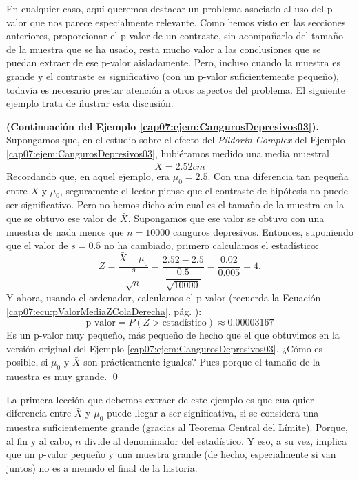 En cualquier caso, aquí queremos destacar un problema asociado al uso del p-valor que nos parece especialmente relevante. Como hemos visto en las secciones anteriores, proporcionar el p-valor de un contraste, sin acompañarlo del tamaño de la muestra que se ha usado, resta mucho valor a las conclusiones que se puedan extraer de ese p-valor aisladamente.
Pero, incluso cuando la muestra es grande y el contraste es significativo (con un p-valor suficientemente pequeño), todavía es necesario prestar atención a otros aspectos del problema. El siguiente ejemplo trata de ilustrar esta discusión.
\begin{ejemplo}{\bf (Continuación del Ejemplo \ref{cap07:ejem:CangurosDepresivos03}).}
\label{cap07:ejem:AbusoPValor}
Supongamos que, en el estudio sobre el efecto del {\em Pildorín Complex} del Ejemplo \ref{cap07:ejem:CangurosDepresivos03}, hubiéramos medido una media muestral
\[\bar X=2.52 cm\]
Recordando que, en aquel ejemplo, era $\mu_0=2.5$. Con una diferencia tan pequeña entre $\bar X$ y $\mu_0$, seguramente el lector piense que el contraste de hipótesis no puede ser significativo. Pero no hemos dicho aún cual es el tamaño de la muestra en la que se obtuvo ese valor de $\bar X$. Supongamos que ese valor se obtuvo con una muestra de nada menos que $n=10000$ canguros depresivos. Entonces, suponiendo que el valor de $s=0.5$ no ha cambiado, primero calculamos el estadístico:
        \[
         Z=\dfrac{\bar X-\mu_0}{\dfrac{s}{\sqrt{n}}}=
         \dfrac{2.52-2.5}{\dfrac{0.5}{\sqrt{10000}}}=\dfrac{0.02}{0.005}=4.
         \]
Y ahora, usando el ordenador, calculamos el p-valor (recuerda la Ecuación \ref{cap07:ecu:pValorMediaZColaDerecha}, pág. \pageref{cap07:ecu:pValorMediaZColaDerecha}):
\[\mbox{p-valor}=P\left(Z > \mbox{estadístico}\right)\approx 0.00003167\]
Es un p-valor muy pequeño, más pequeño de hecho que el que obtuvimos en la versión original del Ejemplo \ref{cap07:ejem:CangurosDepresivos03}. ¿Cómo es posible, si $\mu_0$ y $\bar X$ son prácticamente iguales? Pues porque el tamaño de la muestra es muy grande.
\qed
\end{ejemplo}
La primera lección que debemos extraer de este ejemplo es que cualquier diferencia entre $\bar X$ y $\mu_0$ puede llegar a ser significativa, si se considera una muestra suficientemente grande (gracias al Teorema Central del Límite). Porque, al fin y al cabo, $n$ divide al denominador del estadístico.
Y eso, a su vez, implica que un p-valor pequeño y una muestra grande (de hecho, especialmente si van juntos) no es a menudo el final de la historia.

